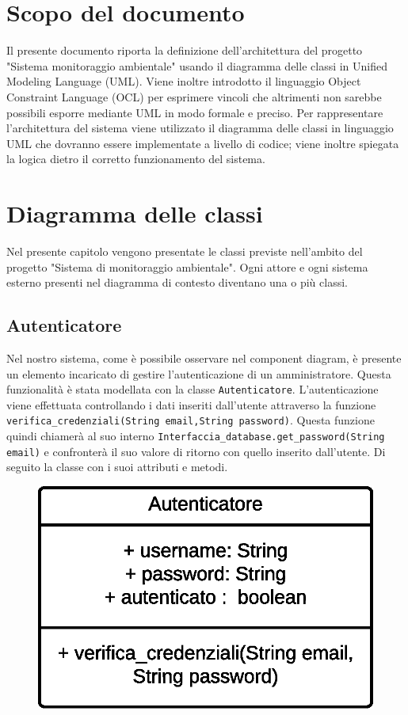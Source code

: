 \chapter*{Scopo del documento}
Il presente documento riporta la definizione dell’architettura del progetto "Sistema monitoraggio ambientale" usando il diagramma delle classi in Unified Modeling Language (UML). Viene inoltre introdotto il linguaggio Object Constraint Language (OCL) per esprimere vincoli che altrimenti non sarebbe possibili esporre mediante UML in modo formale e preciso.
Per rappresentare l'architettura del sistema viene utilizzato il diagramma delle classi in linguaggio UML che dovranno essere implementate a livello di codice; viene inoltre spiegata la logica dietro il corretto funzionamento del sistema.

\chapter{Diagramma delle classi}

Nel presente capitolo vengono presentate le classi previste nell’ambito del progetto "Sistema di monitoraggio ambientale". Ogni attore e ogni sistema esterno presenti nel diagramma di contesto diventano una o più classi. 

\section{Autenticatore}
Nel nostro sistema, come è possibile osservare nel component diagram, è presente un elemento incaricato di gestire l'autenticazione di un amministratore. Questa funzionalità è stata modellata con la classe \texttt{Autenticatore}. L'autenticazione viene effettuata controllando i dati inseriti dall'utente attraverso la funzione \\ \texttt{verifica\_credenziali(String email,String password)}. Questa funzione quindi chiamerà al suo interno  \texttt{Interfaccia\_database.get\_password(String email)} e confronterà il suo valore di ritorno con quello inserito dall'utente. Di seguito la classe con i suoi attributi e metodi.

\begin{figure}[ht]
    \centering
    \includegraphics[scale=0.4]{Img/ClassAutenticatore.eps}
\end{figure}

